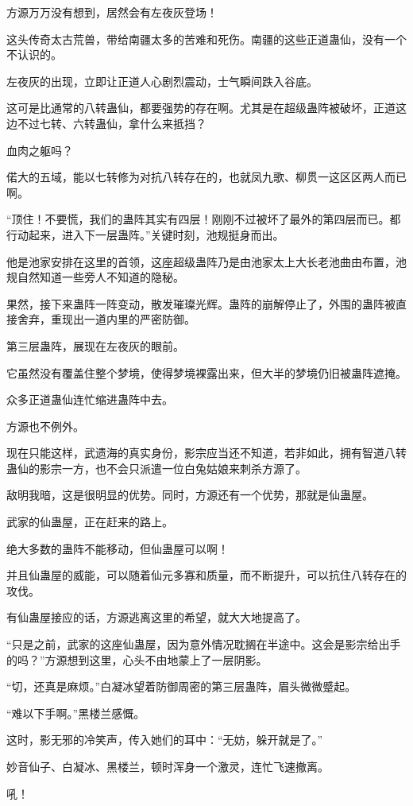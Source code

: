 \begin{this_body}
方源万万没有想到，居然会有左夜灰登场！

这头传奇太古荒兽，带给南疆太多的苦难和死伤。南疆的这些正道蛊仙，没有一个不认识的。

左夜灰的出现，立即让正道人心剧烈震动，士气瞬间跌入谷底。

这可是比通常的八转蛊仙，都要强势的存在啊。尤其是在超级蛊阵被破坏，正道这边不过七转、六转蛊仙，拿什么来抵挡？

血肉之躯吗？

偌大的五域，能以七转修为对抗八转存在的，也就凤九歌、柳贯一这区区两人而已啊。

“顶住！不要慌，我们的蛊阵其实有四层！刚刚不过被坏了最外的第四层而已。都行动起来，进入下一层蛊阵。”关键时刻，池规挺身而出。

他是池家安排在这里的首领，这座超级蛊阵乃是由池家太上大长老池曲由布置，池规自然知道一些旁人不知道的隐秘。

果然，接下来蛊阵一阵变动，散发璀璨光辉。蛊阵的崩解停止了，外围的蛊阵被直接舍弃，重现出一道内里的严密防御。

第三层蛊阵，展现在左夜灰的眼前。

它虽然没有覆盖住整个梦境，使得梦境裸露出来，但大半的梦境仍旧被蛊阵遮掩。

众多正道蛊仙连忙缩进蛊阵中去。

方源也不例外。

现在只能这样，武遗海的真实身份，影宗应当还不知道，若非如此，拥有智道八转蛊仙的影宗一方，也不会只派遣一位白兔姑娘来刺杀方源了。

敌明我暗，这是很明显的优势。同时，方源还有一个优势，那就是仙蛊屋。

武家的仙蛊屋，正在赶来的路上。

绝大多数的蛊阵不能移动，但仙蛊屋可以啊！

并且仙蛊屋的威能，可以随着仙元多寡和质量，而不断提升，可以抗住八转存在的攻伐。

有仙蛊屋接应的话，方源逃离这里的希望，就大大地提高了。

“只是之前，武家的这座仙蛊屋，因为意外情况耽搁在半途中。这会是影宗给出手的吗？”方源想到这里，心头不由地蒙上了一层阴影。

“切，还真是麻烦。”白凝冰望着防御周密的第三层蛊阵，眉头微微蹙起。

“难以下手啊。”黑楼兰感慨。

这时，影无邪的冷笑声，传入她们的耳中：“无妨，躲开就是了。”

妙音仙子、白凝冰、黑楼兰，顿时浑身一个激灵，连忙飞速撤离。

吼！


\end{this_body}
